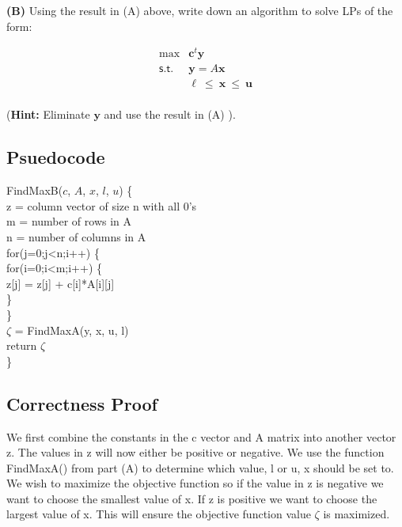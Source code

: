 \documentclass[11pt]{article}
\begin{document}
\medskip

\noindent\textbf{(B)} Using the result in (A) above, write down an
algorithm to solve LPs of the form:

\[ \begin{array}{rl}
\max & \mathbf{c}^t \mathbf{y} \\
\mathsf{s.t.} & \mathbf{y} = A \mathbf{x} \\
& \mathbf{\ell}\ \leq\ \mathbf{x}\ \leq\ \mathbf{u} \\
\end{array}\]

(\textbf{Hint:} Eliminate $\mathbf{y}$ and use the result in (A) ).
\\
\subsection*{Psuedocode}
{\selectfont
FindMaxB($c$, $A$, $x$, $l$, $u$) \{ \\
\hspace*{1em} z = column vector of size n with all 0's \\
\hspace*{1em} m = number of rows in A \\
\hspace*{1em} n = number of columns in A \\
\hspace*{1em} for(j=0;j<n;i++) \{ \\
\hspace*{2em} for(i=0;i<m;i++) \{ \\
\hspace*{3em} z[j] = z[j] + c[i]*A[i][j] \\
\hspace*{2em} \} \\
\hspace*{1em} \} \\
\hspace*{1em} $\zeta$ = FindMaxA(y, x, u, l) \\
\hspace*{1em} return $\zeta$ \\
\}
}
\subsection*{Correctness Proof}
We first combine the constants in the c vector and A matrix into another vector z.  The values in z will now either be positive or negative.  We use the function FindMaxA() from part (A) to determine which value, l or u, x should be set to.  We wish to maximize the objective function so if the value in z is negative we want to choose the smallest value of x.  If z is positive we want to choose the largest value of x.  This will ensure the objective function value $\zeta$ is maximized.  
\end{document}
